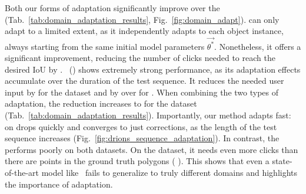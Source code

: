 Both our forms of adaptation significantly improve over the \fixedmodellong{} (Tab.~\ref{tab:domain_adaptation_results}, Fig.~\ref{fig:domain_adapt}). 
\uc \imageSGD{} can only adapt to a limited extent, as it independently adapts to each object instance, always starting from the same initial model parameters $\vec{\theta^*}$.
Nonetheless, it offers a significant improvement, reducing the number of clicks needed to reach the desired IoU by .
\uc \datasetSGD{}~(\sequenceadaptationshort{}) shows extremely strong performance, as its adaptation effects accumulate over the duration of the test sequence.
It reduces the needed user input by  for the \rooftop{} dataset and by over  for \medical{}.
When combining the two types of adaptation, the reduction increases to  for the \medical{} dataset (Tab.~\ref{tab:domain_adaptation_results}).
Importantly, our method adapts fast: on \medical{}
drops quickly and converges to just  corrections, as the length of the test sequence increases (Fig.~\ref{fig:drions_sequence_adaptation}). 
In contrast, the \fixedmodellong{} performs poorly on both datasets.
On the \rooftop{} dataset, it needs even more clicks than there are points in the ground truth polygons ( \vs {}). This shows that even a state-of-the-art model like~\cite{mahadevan18bmvc} fails to generalize to truly different domains and highlights the importance of adaptation.

